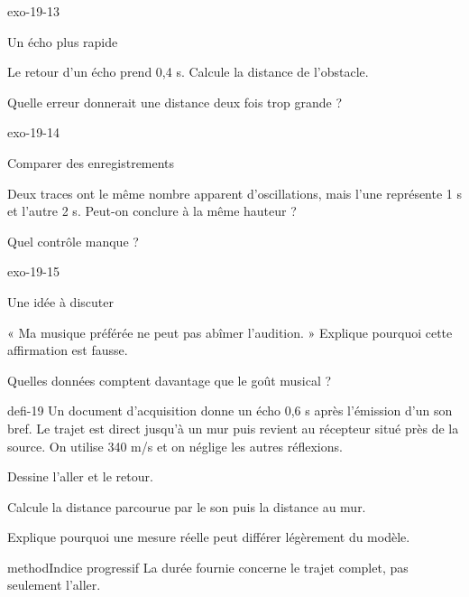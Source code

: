 \documentclass[12pt,twoside,openany]{book}
\begin{document}
\begin{blocLivre}{exo-19-13}
\begin{exercice}[3]{Un écho plus rapide}
\begin{questions}
\item Le retour d’un écho prend 0,4 s. Calcule la distance de l’obstacle.
\item Quelle erreur donnerait une distance deux fois trop grande ?
\end{questions}
\end{exercice}\end{blocLivre}
\begin{blocLivre}{exo-19-14}
\begin{exercice}[3]{Comparer des enregistrements}
\begin{questions}
\item Deux traces ont le même nombre apparent d’oscillations, mais l’une représente 1 s et l’autre 2 s. Peut-on conclure à la même hauteur ?
\item Quel contrôle manque ?
\end{questions}
\end{exercice}\end{blocLivre}
\begin{blocLivre}{exo-19-15}
\begin{exercice}[3]{Une idée à discuter}
\begin{questions}
\item « Ma musique préférée ne peut pas abîmer l’audition. » Explique pourquoi cette affirmation est fausse.
\item Quelles données comptent davantage que le goût musical ?
\end{questions}
\end{exercice}\end{blocLivre}
\label{defi-ex-19}
\begin{pcFiche}{defi-19}
Un document d’acquisition donne un écho 0,6 s après l’émission d’un son bref. Le trajet est direct jusqu’à un mur puis revient au récepteur situé près de la source. On utilise 340 m/s et on néglige les autres réflexions.\par
{}
\begin{questions}
\item Dessine l’aller et le retour.
\item Calcule la distance parcourue par le son puis la distance au mur.
\item Explique pourquoi une mesure réelle peut différer légèrement du modèle.
\end{questions}
\begin{pcEncadre}{method}{Indice progressif}
La durée fournie concerne le trajet complet, pas seulement l’aller.\par
\end{pcEncadre}
\end{pcFiche}
\end{document}
